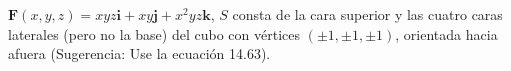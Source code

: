 \item $\mathbf{F}(x, y, z) = xyz \mathbf{i} + xy \mathbf{j} + x^2yz \mathbf{k}$, $S$ consta de la cara superior y las cuatro caras laterales (pero no la base) del cubo con vértices $(\pm 1, \pm 1, \pm 1)$, orientada hacia afuera (Sugerencia: Use la ecuación 14.63).
